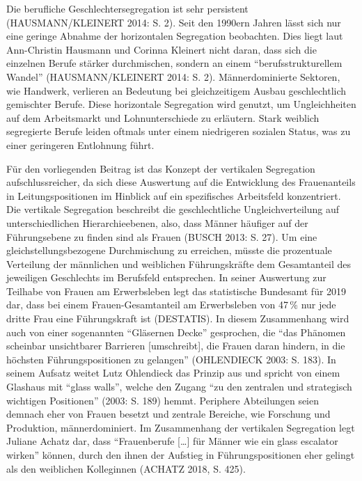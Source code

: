\documentclass[a4paper,
fontsize=11pt,
oneside,
numbers=noperiodatend,
parskip=half-,
bibliography=totoc,
final
]{scrartcl}
\begin{document}
Die berufliche Geschlechtersegregation ist sehr persistent
(HAUSMANN/KLEINERT 2014: S. 2). Seit den 1990ern Jahren lässt sich nur
eine geringe Abnahme der horizontalen Segregation beobachten. Dies liegt
laut Ann-Christin Hausmann und Corinna Kleinert nicht daran, dass sich
die einzelnen Berufe stärker durchmischen, sondern an einem
\enquote{berufsstrukturellem Wandel} (HAUSMANN/KLEINERT 2014: S. 2).
Männerdominierte Sektoren, wie Handwerk, verlieren an Bedeutung bei
gleichzeitigem Ausbau geschlechtlich gemischter Berufe. Diese
horizontale Segregation wird genutzt, um Ungleichheiten auf dem
Arbeitsmarkt und Lohnunterschiede zu erläutern. Stark weiblich
segregierte Berufe leiden oftmals unter einem niedrigeren sozialen
Status, was zu einer geringeren Entlohnung führt.

Für den vorliegenden Beitrag ist das Konzept der vertikalen Segregation
aufschlussreicher, da sich diese Auswertung auf die Entwicklung des
Frauenanteils in Leitungspositionen im Hinblick auf ein spezifisches
Arbeitsfeld konzentriert. Die vertikale Segregation beschreibt die
geschlechtliche Ungleichverteilung auf unterschiedlichen
Hierarchieebenen, also, dass Männer häufiger auf der Führungsebene zu
finden sind als Frauen (BUSCH 2013: S. 27). Um eine
gleichstellungsbezogene Durchmischung zu erreichen, müsste die
prozentuale Verteilung der männlichen und weiblichen Führungskräfte dem
Gesamtanteil des jeweiligen Geschlechts im Berufsfeld entsprechen. In
seiner Auswertung zur Teilhabe von Frauen am Erwerbsleben legt das
statistische Bundesamt für 2019 dar, dass bei einem Frauen-Gesamtanteil
am Erwerbsleben von 47\,\% nur jede dritte Frau eine Führungskraft ist
(DESTATIS). In diesem Zusammenhang wird auch von einer sogenannten
\enquote{Gläsernen Decke} gesprochen, die \enquote{das Phänomen
scheinbar unsichtbarer Barrieren {[}umschreibt{]}, die Frauen daran
hindern, in die höchsten Führungspositionen zu gelangen} (OHLENDIECK
2003: S. 183). In seinem Aufsatz weitet Lutz Ohlendieck das Prinzip aus
und spricht von einem Glashaus mit \enquote{glass walls}, welche den
Zugang \enquote{zu den zentralen und strategisch wichtigen Positionen}
(2003: S. 189) hemmt. Periphere Abteilungen seien demnach eher von
Frauen besetzt und zentrale Bereiche, wie Forschung und Produktion,
männerdominiert. Im Zusammenhang der vertikalen Segregation legt Juliane
Achatz dar, dass \enquote{Frauenberufe {[}\ldots{]} für Männer wie ein
glass escalator wirken} können, durch den ihnen der Aufstieg in
Führungspositionen eher gelingt als den weiblichen Kolleginnen (ACHATZ
2018, S. 425).
\end{document}
